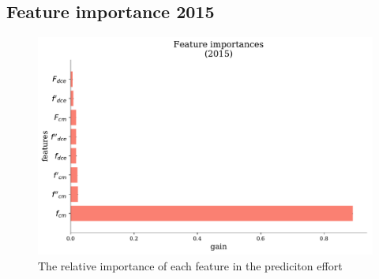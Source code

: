 \documentclass[a4paper]{article}
\begin{document}


\subsection{Feature importance 2015}\label{feature_imp2015}


\begin{figure}[!htb]
 	\centering
	\includegraphics[scale=0.47]{feature_imp_2015.pdf}
  \caption{\footnotesize{The relative importance of each feature in the prediciton effort}}
\end{figure}
\pagebreak
\end{document}
